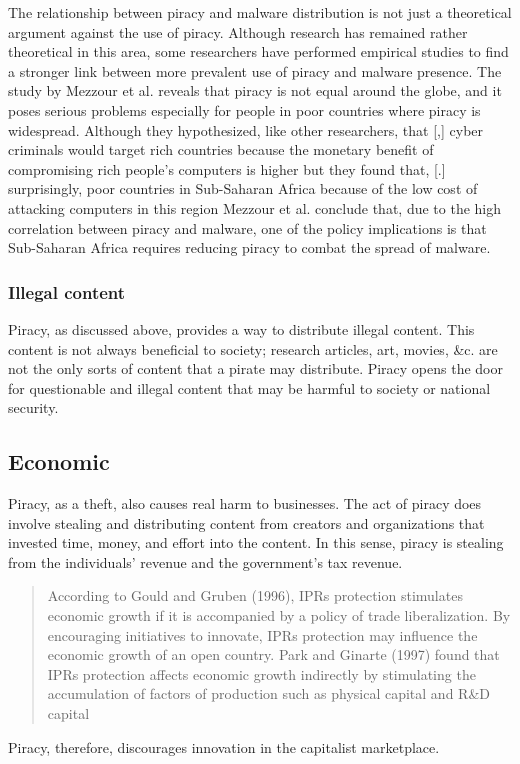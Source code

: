 \documentclass[onecolumn, 12pt]{article}
\begin{document}
The relationship between piracy and malware distribution is not just a
theoretical argument against the use of piracy. Although research has remained
rather theoretical in this area, some researchers have performed empirical
studies to find a stronger link between more prevalent use of piracy and
malware presence. The study by Mezzour et al. reveals that piracy is not equal
around the globe, and it poses serious problems especially for people in
poor countries where piracy is widespread. Although they hypothesized, like
other researchers, that [,]{%
  cyber criminals would target rich countries because the monetary benefit of
  compromising rich people's computers is higher
} but they found that, [.]{%
  surprisingly, poor countries in Sub-Saharan Africa because of the low cost of
  attacking computers in this region%
} Mezzour et al. conclude that, due to the high correlation between piracy
and malware, one of the policy implications is that Sub-Saharan Africa requires
reducing piracy to combat the spread of malware.


\subsubsection{Illegal content}
Piracy, as discussed above, provides a way to distribute illegal content. This
content is not always beneficial to society; research articles, art, movies, \&c.
are not the only sorts of content that a pirate may distribute. Piracy opens
the door for questionable and illegal content that may be harmful to society
or national security.


\subsection{Economic}
Piracy, as a theft, also causes real harm to businesses. The act of piracy
does involve stealing and distributing content from creators and organizations
that invested time, money, and effort into the content. In this sense, piracy
is stealing from the individuals' revenue and the government's tax
revenue.~\cite{congress:pirating-the-american-dream}

\blockcquote{mrad:effects-of-ip}[.]{%
  According to Gould and Gruben (1996), IPRs protection stimulates economic
  growth if it is accompanied by a policy of trade liberalization. By
  encouraging initiatives to innovate, IPRs protection may influence the
  economic growth of an open country. Park and Ginarte (1997) found that IPRs
  protection affects economic growth indirectly by stimulating the accumulation
  of factors of production such as physical capital and R\&D capital%
}
Piracy, therefore, discourages innovation in the capitalist marketplace.
\end{document}
